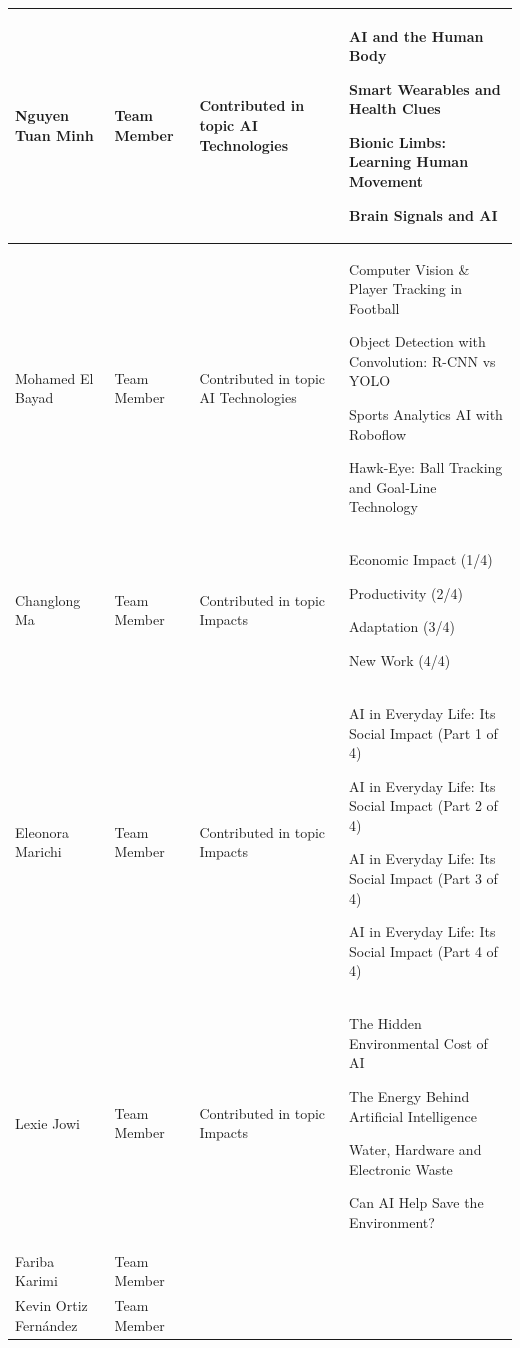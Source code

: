 \documentclass[11pt]{article}
\begin{document}
\begin{longtable} [c] {|p{3cm}|l|p{7cm}|p{4cm}|}
	Nguyen Tuan Minh & Team Member &
	\par \textbullet{} Contributed in topic AI Technologies &
	\par \textbullet{} AI and the Human Body
	\par \textbullet{} Smart Wearables and Health Clues
	\par \textbullet{} Bionic Limbs: Learning Human Movement
	\par \textbullet{} Brain Signals and AI \\ 
	\hline
	
	Mohamed El Bayad & Team Member &
	\par \textbullet{} Contributed in topic AI Technologies &
	\par \textbullet{} Computer Vision \& Player Tracking in Football
	\par \textbullet{} Object Detection with Convolution: R-CNN vs YOLO
	\par \textbullet{} Sports Analytics AI with Roboflow
	\par \textbullet{} Hawk-Eye: Ball Tracking and Goal-Line Technology \\ 
	\hline
	
	Changlong Ma & Team Member &
	\par \textbullet{} Contributed in topic Impacts &
	\par \textbullet{} Economic Impact (1/4)
	\par \textbullet{} Productivity (2/4)
	\par \textbullet{} Adaptation (3/4)
	\par \textbullet{} New Work (4/4) \\ 
	\hline
	
	Eleonora Marichi & Team Member &
	\par \textbullet{} Contributed in topic Impacts &
	\par \textbullet{} AI in Everyday Life: Its Social Impact (Part 1 of 4)
	\par \textbullet{} AI in Everyday Life: Its Social Impact (Part 2 of 4)
	\par \textbullet{} AI in Everyday Life: Its Social Impact (Part 3 of 4)
	\par \textbullet{} AI in Everyday Life: Its Social Impact (Part 4 of 4) \\ 
	\hline
	
	Lexie Jowi & Team Member &
	\par \textbullet{} Contributed in topic Impacts &
	\par \textbullet{} The Hidden Environmental Cost of AI
	\par \textbullet{} The Energy Behind Artificial Intelligence
	\par \textbullet{} Water, Hardware and Electronic Waste
	\par \textbullet{} Can AI Help Save the Environment? \\ 
	\hline
	
	Fariba Karimi & Team Member &
	\\ 
	\hline
	
	Kevin Ortiz Fernández & Team Member &
	\\ 
	\hline
\end{longtable}
\end{document}
